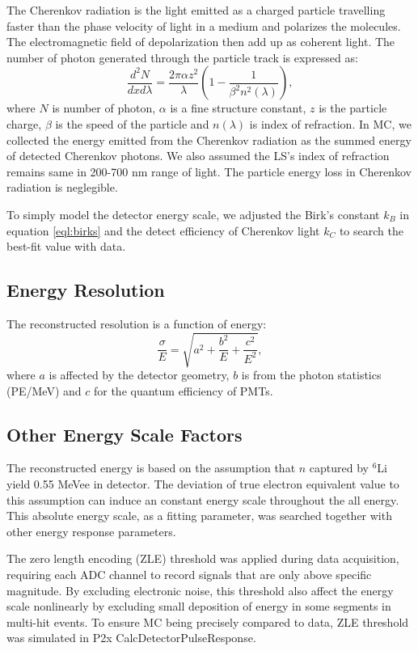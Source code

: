 The Cherenkov radiation is the light emitted as a charged particle travelling faster than the phase velocity of light in a medium and polarizes the molecules. The electromagnetic  field of depolarization then add up as coherent light. The number of photon generated through the particle track is expressed as:
\begin{equation}
    \frac{d^2N}{dxd\lambda} = \frac{2\pi\alpha z^2}{\lambda}\left(1- \frac{1}{\beta^2n^2(\lambda)}\right),
\end{equation}
where $N$ is number of photon, $\alpha$ is a fine structure constant, $z$ is the particle charge, $\beta$ is the speed of the particle and $n(\lambda)$ is index of refraction.
In MC, we collected the energy emitted from the Cherenkov radiation as the summed energy of detected Cherenkov photons. We also assumed the LS's index of refraction remains same in 200-700 nm range of light. The particle energy loss in Cherenkov radiation is neglegible.

To simply model the detector energy scale, we adjusted the Birk's constant $k_B$ in equation \ref{eql:birks} and the detect efficiency of Cherenkov light $k_C$ to search the best-fit value with data.

\subsection{Energy Resolution}
The reconstructed resolution is a function of energy:
\begin{equation}
    \frac{\sigma}{E} = \sqrt{a^2 + \frac{b^2}{E}+\frac{c^2}{E^2}},
\end{equation}
where $a$ is affected by the detector geometry, $b$ is from the photon statistics (PE/MeV) and $c$ for the quantum efficiency of PMTs.

\subsection{Other Energy Scale Factors}
The reconstructed energy is based on the assumption that $n$ captured by $^6$Li yield 0.55 MeVee in detector. The deviation of true electron equivalent value to this assumption can induce an constant energy scale throughout the all energy. This absolute energy scale, as a fitting parameter, was searched together with other energy response parameters.

The zero length encoding (ZLE) threshold was applied during data acquisition, requiring each ADC channel to record signals that are only above specific magnitude. By excluding electronic noise, this threshold also affect the energy scale nonlinearly by excluding small deposition of energy in some segments in multi-hit events. To ensure MC being precisely compared to data, ZLE threshold was simulated in P2x CalcDetectorPulseResponse.

